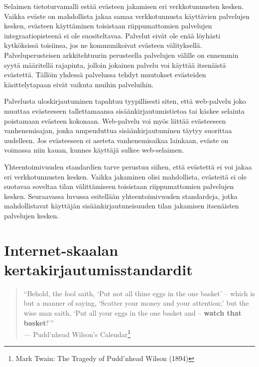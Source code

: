\documentclass[finnish,gradu]{tktltiki}
\begin{document}
  Selaimen tietoturvamalli estää evästeen jakamisen eri verkkotunnusten kesken. Vaikka eväste on mahdollista jakaa samaa verkkotunnusta käyttävien palvelujen kesken, evästeen käyttäminen toisistaan riippumattomien palvelujen integraatiopisteenä ei ole suositeltavaa. Palvelut eivät ole enää löyhästi kytköksissä toisiinsa, jos ne kommunikoivat evästeen välityksellä. Palveluperusteisen arkkitehtuurin perusteella palvelujen välille on ennemmin syytä määritellä rajapinta, jolloin jokainen palvelu voi käyttää itsenäistä evästettä. Tällöin yhdessä palvelussa tehdyt muutokset evästeiden käsittelytapaan eivät vaikuta muihin palveluihin.

  Palvelusta uloskirjautuminen tapahtuu tyypillisesti siten, että web-palvelu joko muuttaa evästeeseen tallettamaansa sisäänkirjautumistietoa tai käskee selainta poistamaan evästeen kokonaan. Web-palvelu voi myös liittää evästeeseen vanhenemisajan, jonka umpeuduttua sisäänkirjautuminen täytyy suorittaa uudelleen. Jos evästeeseen ei aseteta vanhenemisaikaa lainkaan, eväste on voimassa niin kauan, kunnes käyttäjä sulkee web-selaimen.

  Yhteentoimivuuden standardien tarve perustuu siihen, että evästettä ei voi jakaa eri verkkotunnusten kesken. Vaikka jakaminen olisi mahdollista, evästeitä ei ole suotavaa soveltaa tilan välittämiseen toisistaan riippumattomien palvelujen kesken. Seuraavassa luvussa esitellään yhteentoimivuuden standardeja, jotka mahdollistavat käyttäjän sisäänkirjautuneisuuden tilan jakamisen itsenäisten palvelujen kesken.





\newpage
\section{Internet-skaalan kertakirjautumisstandardit} %
\label{sec:Kertakirjautumisstandardit}
  \begin{quote}
      ``Behold, the fool saith, `Put not all thine eggs in the one basket'
      -- which is but a manner of saying, `Scatter your money and your attention;'
      but the wise man saith, `Put all your eggs in the one basket and -- \textbf{watch that basket}!'''
      \\--- Pudd'nhead Wilson's Calendar\footnote{
        Mark Twain: The Tragedy of Pudd'nhead Wilson (1894)
      }
  \end{quote}
\end{document}
